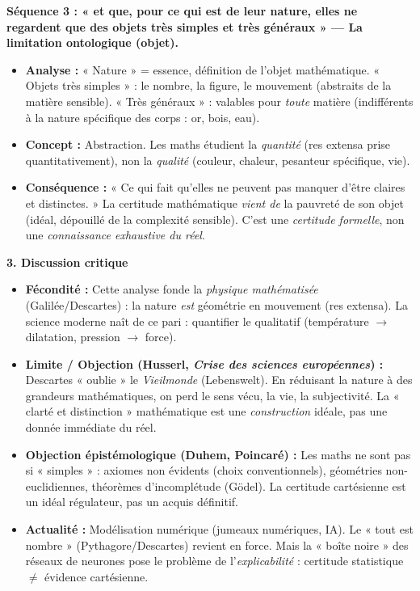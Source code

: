 \documentclass[11pt]{article}
\newcommand{\cle}[1]{{\popxbold\color{popdark}#1}}
\begin{document}
\begin{exoresolu}
    \textbf{Séquence 3 : « et que, pour ce qui est de leur nature, elles ne regardent que des objets très simples et très généraux » — La limitation ontologique (objet).}
    \begin{itemize}
        \item \textbf{Analyse :} « Nature » = essence, définition de l'objet mathématique. « Objets très simples » : le nombre, la figure, le mouvement (abstraits de la matière sensible). « Très généraux » : valables pour \emph{toute} matière (indifférents à la nature spécifique des corps : or, bois, eau).
        \item \textbf{Concept :} \cle{Abstraction}. Les maths étudient la \emph{quantité} (res extensa prise quantitativement), non la \emph{qualité} (couleur, chaleur, pesanteur spécifique, vie).
        \item \textbf{Conséquence :} « Ce qui fait qu'elles ne peuvent pas manquer d'être claires et distinctes. » La certitude mathématique \emph{vient de} la pauvreté de son objet (idéal, dépouillé de la complexité sensible). C'est une \emph{certitude formelle}, non une \emph{connaissance exhaustive du réel}.
    \end{itemize}

    \textbf{3. Discussion critique}
    \begin{itemize}
        \item \textbf{Fécondité :} Cette analyse fonde la \emph{physique mathématisée} (Galilée/Descartes) : la nature \emph{est} géométrie en mouvement (res extensa). La science moderne naît de ce pari : quantifier le qualitatif (température $\rightarrow$ dilatation, pression $\rightarrow$ force).
        \item \textbf{Limite / Objection (Husserl, \emph{Crise des sciences européennes}) :} Descartes « oublie » le \emph{Vieilmonde} (Lebenswelt). En réduisant la nature à des grandeurs mathématiques, on perd le sens vécu, la vie, la subjectivité. La « clarté et distinction » mathématique est une \emph{construction} idéale, pas une donnée immédiate du réel.
        \item \textbf{Objection épistémologique (Duhem, Poincaré) :} Les maths ne sont pas si « simples » : axiomes non évidents (choix conventionnels), géométries non-euclidiennes, théorèmes d'incomplétude (Gödel). La certitude cartésienne est un idéal régulateur, pas un acquis définitif.
        \item \textbf{Actualité :} Modélisation numérique (jumeaux numériques, IA). Le « tout est nombre » (Pythagore/Descartes) revient en force. Mais la « boîte noire » des réseaux de neurones pose le problème de l'\emph{explicabilité} : certitude statistique $\neq$ évidence cartésienne.
    \end{itemize}


\end{exoresolu}
\end{document}
